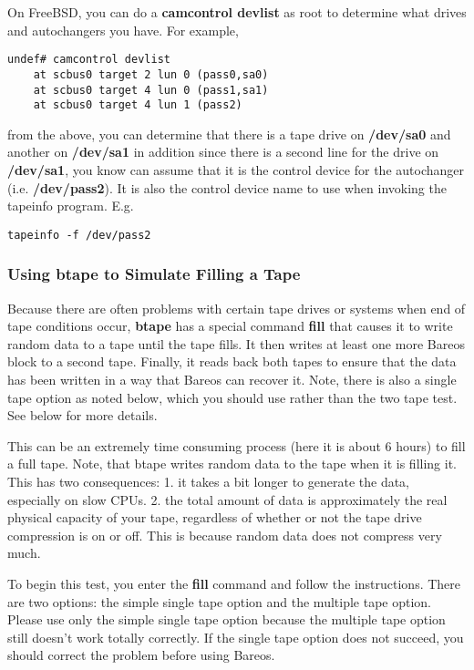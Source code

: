 {On FreeBSD, you can do a {\bf camcontrol devlist} as root to determine what
drives and autochangers you have. For example,

\footnotesize
\begin{verbatim}
undef# camcontrol devlist
    at scbus0 target 2 lun 0 (pass0,sa0)
    at scbus0 target 4 lun 0 (pass1,sa1)
    at scbus0 target 4 lun 1 (pass2)
\end{verbatim}
\normalsize

from the above, you can determine that there is a tape drive on {\bf /dev/sa0}
and another on {\bf /dev/sa1} in addition since there is a second line for the
drive on {\bf /dev/sa1}, you know can assume that it is the control device for
the autochanger (i.e. {\bf /dev/pass2}). It is also the control device name to
use when invoking the tapeinfo program. E.g.

\footnotesize
\begin{verbatim}
tapeinfo -f /dev/pass2
\end{verbatim}
\normalsize


\label{fill}
\subsubsection{Using btape to Simulate Filling a Tape}

Because there are often problems with certain tape drives or systems when end
of tape conditions occur, {\bf btape} has a special command {\bf fill} that
causes it to write random data to a tape until the tape fills. It then writes
at least one more Bareos block to a second tape. Finally, it reads back both
tapes to ensure that the data has been written in a way that Bareos can
recover it. Note, there is also a single tape option as noted below, which you
should use rather than the two tape test. See below for more details.

This can be an extremely time consuming process (here it is about 6 hours) to
fill a full tape. Note, that btape writes random data to the tape when it is
filling it. This has two consequences: 1. it takes a bit longer to generate
the data, especially on slow CPUs. 2. the total amount of data is
approximately the real physical capacity of your tape, regardless of whether
or not the tape drive compression is on or off. This is because random data
does not compress very much.

To begin this test, you enter the {\bf fill} command and follow the
instructions. There are two options: the simple single tape option and the
multiple tape option. Please use only the simple single tape option because
the multiple tape option still doesn't work totally correctly. If the single
tape option does not succeed, you should correct the problem before using
Bareos.
\label{RecoveringFiles}

}
